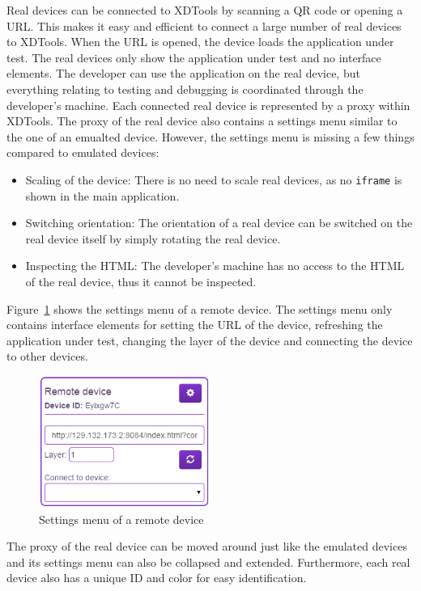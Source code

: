 Real devices can be connected to XDTools by scanning a QR code or opening a URL. This makes it easy and efficient to connect a large number of real devices to XDTools. When the URL is opened, the device loads the application under test. The real devices only show the application under test and no interface elements. The developer can use the application on the real device, but everything relating to testing and debugging is coordinated through the developer's  machine. Each connected real device is represented by a proxy within XDTools. The proxy of the real device also contains a settings menu similar to the one of an emualted device. However, the settings menu is missing a few things compared to emulated devices:
\begin{itemize}
	\item Scaling of the device: There is no need to scale real devices, as no \lstinline|iframe| is shown in the main application.
	\item Switching orientation: The orientation of a real device can be switched on the real device itself by simply rotating the real device.
	\item Inspecting the HTML: The developer's machine has no access to the HTML of the real device, thus it cannot be inspected.
\end{itemize}
Figure~\ref{fig:settings_menu_remote} shows the settings menu of a remote device. The settings menu only contains interface elements for setting the URL of the device, refreshing the application under test, changing the layer of the device and connecting the device to other devices.

\begin{figure}[H]
  \centering
    \includegraphics[width=0.5\textwidth]{images/screenshots/remote_device.png}
	\caption[Screenshot: Settings menu remote device]{Settings menu of a remote device}
	\label{fig:settings_menu_remote}
\end{figure}

The proxy of the real device can be moved around just like the emulated devices and its settings menu can also be collapsed and extended. Furthermore, each real device also has a unique ID and color for easy identification.

